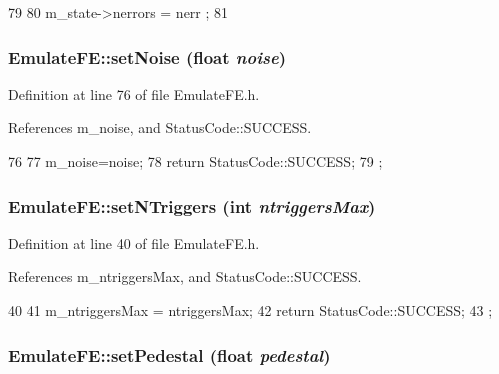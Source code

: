 \begin{DoxyCode}
79                                              {
80   m_state->nerrors = nerr ;
81 }
\end{DoxyCode}
\hypertarget{classEmulateFE_a9b1d0d30631d304fc615c064db8231ca}{
\subsubsection[{setNoise}]{ EmulateFE::setNoise (float {\em noise})}}
\label{classEmulateFE_a9b1d0d30631d304fc615c064db8231ca}


Definition at line 76 of file EmulateFE.h.

References m\_\-noise, and StatusCode::SUCCESS.


\begin{DoxyCode}
76                                    {
77     m_noise=noise;
78     return StatusCode::SUCCESS;
79   };
\end{DoxyCode}
\hypertarget{classEmulateFE_a3a8b53c47db627e5a70076968d5aab53}{
\subsubsection[{setNTriggers}]{ EmulateFE::setNTriggers (int {\em ntriggersMax})}}
\label{classEmulateFE_a3a8b53c47db627e5a70076968d5aab53}


Definition at line 40 of file EmulateFE.h.

References m\_\-ntriggersMax, and StatusCode::SUCCESS.


\begin{DoxyCode}
40                                             {
41     m_ntriggersMax = ntriggersMax;
42     return StatusCode::SUCCESS;
43   };
\end{DoxyCode}
\hypertarget{classEmulateFE_a6328b50231c29fc5a7e6df99a3db3a29}{
\subsubsection[{setPedestal}]{ EmulateFE::setPedestal (float {\em pedestal})}}
\label{classEmulateFE_a6328b50231c29fc5a7e6df99a3db3a29}


